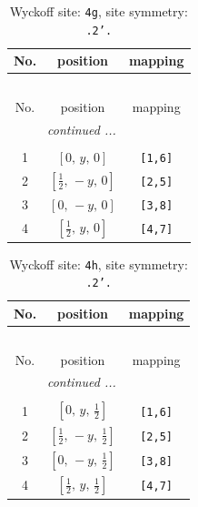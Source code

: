 \documentclass[fleqn,8pt]{jsarticle}
\begin{document}
\begin{longtable}{ccc}
\caption{Wyckoff site: {\tt 4g}, site symmetry: {\tt .2'.}}
 \\
 \hline \hline
No. & position & mapping \\ \hline \endfirsthead

\multicolumn{2}{l}{\tablename\ \thetable{}} \\
 \hline \hline
No. & position & mapping \\ \hline \endhead

 \hline \hline
\multicolumn{2}{r}{\footnotesize\it continued ...} \\ \endfoot

 \hline \hline
\multicolumn{2}{r}{} \\ \endlastfoot

1 & $\left[ 0,\, y,\, 0 \right]$ & {\tt [1,6]} \\ \hline
2 & $\left[ \frac{1}{2},\, - y,\, 0 \right]$ & {\tt [2,5]} \\ \hline
3 & $\left[ 0,\, - y,\, 0 \right]$ & {\tt [3,8]} \\ \hline
4 & $\left[ \frac{1}{2},\, y,\, 0 \right]$ & {\tt [4,7]} \\
\end{longtable}
\renewcommand{\arraystretch}{1.2}
\begin{longtable}{ccc}
\caption{Wyckoff site: {\tt 4h}, site symmetry: {\tt .2'.}}
 \\
 \hline \hline
No. & position & mapping \\ \hline \endfirsthead

\multicolumn{2}{l}{\tablename\ \thetable{}} \\
 \hline \hline
No. & position & mapping \\ \hline \endhead

 \hline \hline
\multicolumn{2}{r}{\footnotesize\it continued ...} \\ \endfoot

 \hline \hline
\multicolumn{2}{r}{} \\ \endlastfoot

1 & $\left[ 0,\, y,\, \frac{1}{2} \right]$ & {\tt [1,6]} \\ \hline
2 & $\left[ \frac{1}{2},\, - y,\, \frac{1}{2} \right]$ & {\tt [2,5]} \\ \hline
3 & $\left[ 0,\, - y,\, \frac{1}{2} \right]$ & {\tt [3,8]} \\ \hline
4 & $\left[ \frac{1}{2},\, y,\, \frac{1}{2} \right]$ & {\tt [4,7]} \\
\end{longtable}
\end{document}
